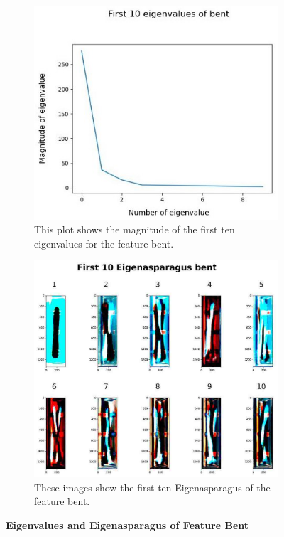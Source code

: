\begin{figure}[!h]
	\centering
	\begin{subfigure}{0.7\textwidth}
		\includegraphics[width=0.9\linewidth]{Figures/chapter04/pca_bent_graph.png} 
		\caption{This plot shows the magnitude of the first ten eigenvalues for the feature bent.}
	\end{subfigure}
	\vspace{20pt}
	
	\begin{subfigure}{0.9\textwidth}
		\includegraphics[width=0.9\linewidth]{Figures/chapter04/pca_bent.png}
		\caption{These images show the first ten Eigenasparagus of the feature bent.}
	\end{subfigure}
    \caption[First Ten Eigenvalues and Eigenasparagus of Feature Bent]{\textbf{Eigenvalues and Eigenasparagus of Feature Bent}}
    \label{fig:PCAbent}
\end{figure}

